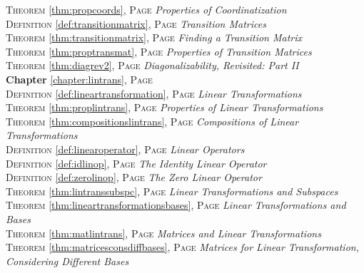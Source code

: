 \begin{multicols}{2}
{\textsc{Theorem} \ref{thm:propcoords}, \textsc{Page} \pageref{thm:propcoords} \textit{Properties of Coordinatization} \\
\textsc{Definition} \ref{def:transitionmatrix}, \textsc{Page} \pageref{def:transitionmatrix} \textit{Transition Matrices} \\
\textsc{Theorem} \ref{thm:transitionmatrix}, \textsc{Page} \pageref{thm:transitionmatrix} \textit{Finding a Transition Matrix} \\
\textsc{Theorem} \ref{thm:proptransmat}, \textsc{Page} \pageref{thm:proptransmat} \textit{Properties of Transition Matrices} \\
\textsc{Theorem} \ref{thm:diagrev2}, \textsc{Page} \pageref{thm:diagrev2} \textit{Diagonalizability, Revisited: Part II} \\
\textbf{Chapter} \ref{chapter:lintrans}, \textsc{Page} \pageref{chapter:lintrans} \\
\textsc{Definition} \ref{def:lineartransformation}, \textsc{Page} \pageref{def:lineartransformation} \textit{Linear Transformations} \\
\textsc{Theorem} \ref{thm:proplintrans}, \textsc{Page} \pageref{thm:proplintrans} \textit{Properties of Linear Transformations} \\
\textsc{Theorem} \ref{thm:compositionslintrans}, \textsc{Page} \pageref{thm:compositionslintrans} \textit{Compositions of Linear Transformations} \\
\textsc{Definition} \ref{def:linearoperator}, \textsc{Page} \pageref{def:linearoperator} \textit{Linear Operators} \\
\textsc{Definition} \ref{def:idlinop}, \textsc{Page} \pageref{def:idlinop} \textit{The Identity Linear Operator} \\
\textsc{Definition} \ref{def:zerolinop}, \textsc{Page} \pageref{def:zerolinop} \textit{The Zero Linear Operator} \\
\textsc{Theorem} \ref{thm:lintranssubspc}, \textsc{Page} \pageref{thm:lintranssubspc} \textit{Linear Transformations and Subspaces} \\
\textsc{Theorem} \ref{thm:lineartransformationsbases}, \textsc{Page} \pageref{thm:lineartransformationsbases} \textit{Linear Transformations and Bases} \\
\textsc{Theorem} \ref{thm:matlintrans}, \textsc{Page} \pageref{thm:matlintrans} \textit{Matrices and Linear Transformations} \\
\textsc{Theorem} \ref{thm:matricesconsdiffbases}, \textsc{Page} \pageref{thm:matricesconsdiffbases} \textit{Matrices for Linear Transformation, Considering Different Bases} \\
}
\end{multicols}
